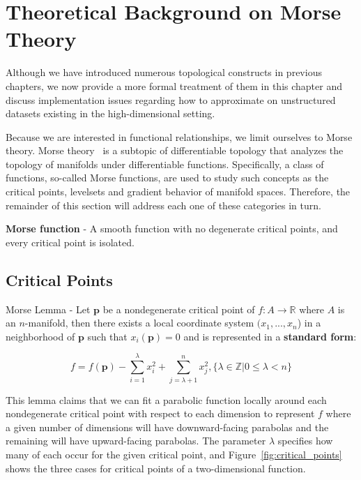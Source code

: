 
\chapter{Theoretical Background on Morse Theory}
\label{ch:theory}

Although we have introduced numerous topological constructs in previous chapters, we now provide a more formal treatment of them in this chapter and discuss implementation issues regarding how to approximate on unstructured datasets existing in the high-dimensional setting.

Because we are interested in functional relationships, we limit ourselves to Morse theory.
%
Morse theory~\cite{Matsumoto2002,Milnor1973,Morse1949} is a subtopic of differentiable topology that analyzes the topology of manifolds under differentiable functions.
%
Specifically, a class of functions, so-called Morse functions, are used to study such concepts as the critical points, levelsets and gradient behavior of manifold spaces.
%
Therefore, the remainder of this section will address each one of these categories in turn.

\begin{defn}
  \textbf{Morse function} - A smooth function with no degenerate critical points, and every critical point is isolated.
\end{defn}

\section{Critical Points}

\begin{lem} Morse Lemma - Let $\mathbf{p}$ be a nondegenerate critical point of $f : A \rightarrow \mathbb{R}$ where $A$ is an $n$-manifold, then there exists a local coordinate system $(x_1,...,x_n$) in a neighborhood of $\mathbf{p}$ such that $x_i(\mathbf{p}) = 0$ and is represented in a \textbf{standard form}:

\begin{equation}
f = f(\mathbf{p}) - \sum_{i=1}^{\lambda}x_i^2 + \sum_{j=\lambda+1}^n x_j^2, \{\lambda \in \mathbb{Z} | 0 \leq \lambda < n\}
\end{equation}
\end{lem}

This lemma claims that we can fit a parabolic function locally around each nondegenerate critical point with respect to each dimension to represent $f$ where a given number of dimensions will have downward-facing parabolas and the remaining will have upward-facing parabolas.
%
The parameter $\lambda$ specifies how many of each occur for the given critical point, and Figure~\ref{fig:critical_points} shows the three cases for critical points of a two-dimensional function.

